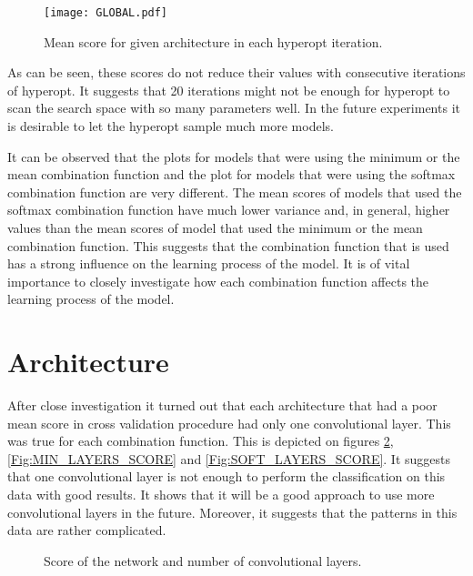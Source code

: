 \documentclass[a4paper,10pt]{report}
\begin{document}
    \begin{figure}[h!]
	\centering
	\texttt{[image: GLOBAL.pdf]}
	\caption{Mean score for given architecture in each hyperopt iteration.}
	\label{GLOBAL}
    \end{figure} 
    
    As can be seen, these scores do not reduce their values with consecutive iterations of hyperopt. It suggests that 20 iterations might not be enough for hyperopt to scan the search space with so many parameters well. In the future experiments it is desirable to let the hyperopt sample much more models.

    It can be observed that the plots for models that were using the minimum or the mean combination function and the plot for models that were using the softmax combination function are very different. The mean scores of models that used the softmax combination function have much lower variance and, in general, higher values than the mean scores of model that used the minimum or the mean combination function. This suggests that the combination function that is used has a strong influence on the learning process of the model. It is of vital importance to closely investigate how each combination function affects the learning process of the model.

    \section{Architecture}
    
    After close investigation it turned out that each architecture that had a poor mean score in cross validation procedure had only one convolutional layer. This was true for each combination function. This is depicted on figures \ref{Fig:MEAN_LAYERS_SCORE}, \ref{Fig:MIN_LAYERS_SCORE} and \ref{Fig:SOFT_LAYERS_SCORE}. It suggests that one convolutional layer is not enough to perform the classification on this data with good results. It shows that it will be a good approach to use more convolutional layers in the future. Moreover, it suggests that the patterns in this data are rather complicated.
    
    \begin{figure}[!htb]\centering
      \begin {minipage}{\textwidth}
	\caption{Score of the network and number of convolutional layers.}\label{Fig:MEAN_LAYERS_SCORE}
      \end{minipage}
     \end{figure}
     
\end{document}
